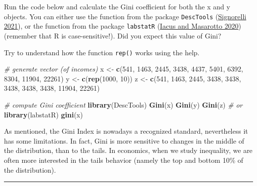 \documentclass[
]{article}
\newenvironment{Shaded}{\begin{snugshade}}{\end{snugshade}}
\newcommand{\CommentTok}[1]{\textcolor[rgb]{0.56,0.35,0.01}{\textit{#1}}}
\newcommand{\DecValTok}[1]{\textcolor[rgb]{0.00,0.00,0.81}{#1}}
\newcommand{\FunctionTok}[1]{\textcolor[rgb]{0.13,0.29,0.53}{\textbf{#1}}}
\newcommand{\NormalTok}[1]{#1}
\newcommand{\OtherTok}[1]{\textcolor[rgb]{0.56,0.35,0.01}{#1}}
\begin{document}
Run the code below and calculate the Gini coefficient for both the x and
y objects. You can either use the function from the package \texttt{DescTools}
(\protect\hyperlink{ref-signorelli2021}{Signorelli 2021}), or the function from the package \texttt{labstatR}
(\protect\hyperlink{ref-iacus2020}{Iacus and Masarotto 2020}) (remember that R is case-sensitive!). Did you expect this
value of Gini?

Try to understand how the function \texttt{rep()} works using the help.

\begin{Shaded}
\begin{Highlighting}[]
\CommentTok{\# generate vector (of incomes)}
\NormalTok{x }\OtherTok{\textless{}{-}} \FunctionTok{c}\NormalTok{(}\DecValTok{541}\NormalTok{, }\DecValTok{1463}\NormalTok{, }\DecValTok{2445}\NormalTok{, }\DecValTok{3438}\NormalTok{, }\DecValTok{4437}\NormalTok{, }\DecValTok{5401}\NormalTok{, }\DecValTok{6392}\NormalTok{, }\DecValTok{8304}\NormalTok{, }\DecValTok{11904}\NormalTok{, }\DecValTok{22261}\NormalTok{)}
\NormalTok{y }\OtherTok{\textless{}{-}} \FunctionTok{c}\NormalTok{(}\FunctionTok{rep}\NormalTok{(}\DecValTok{1000}\NormalTok{, }\DecValTok{10}\NormalTok{))}
\NormalTok{z }\OtherTok{\textless{}{-}} \FunctionTok{c}\NormalTok{(}\DecValTok{541}\NormalTok{, }\DecValTok{1463}\NormalTok{, }\DecValTok{2445}\NormalTok{, }\DecValTok{3438}\NormalTok{, }\DecValTok{3438}\NormalTok{, }\DecValTok{3438}\NormalTok{, }\DecValTok{3438}\NormalTok{, }\DecValTok{3438}\NormalTok{, }\DecValTok{11904}\NormalTok{, }\DecValTok{22261}\NormalTok{)}

\CommentTok{\# compute Gini coefficient}
\FunctionTok{library}\NormalTok{(DescTools)}
\FunctionTok{Gini}\NormalTok{(x)}
\FunctionTok{Gini}\NormalTok{(y)}
\FunctionTok{Gini}\NormalTok{(z)}
\CommentTok{\# or}
\FunctionTok{library}\NormalTok{(labstatR)}
\FunctionTok{gini}\NormalTok{(x)}
\end{Highlighting}
\end{Shaded}

As mentioned, the Gini Index is nowadays a recognized standard,
nevertheless it has some limitations. In fact, Gini is more sensitive to
changes in the middle of the distribution, than to the tails. In
economics, when we study inequality, we are often more interested in the
tails behavior (namely the top and bottom 10\% of the distribution).

\begin{center}\rule{0.5\linewidth}{0.5pt}\end{center}
\end{document}
